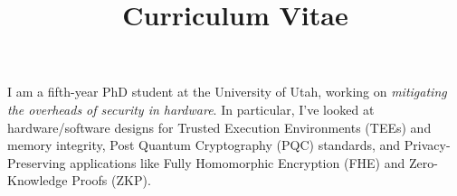 \documentclass[a4paper,skipsamekey,11pt,english]{curve}
\title{Curriculum Vitae}
\begin{document}
\makeheaders[c]

{I am a fifth-year PhD student at the University of Utah, working on \emph{mitigating the overheads of security in hardware}. In particular, I've looked at hardware/software designs for Trusted Execution Environments (TEEs) and memory integrity, Post Quantum Cryptography (PQC) standards, and Privacy-Preserving applications like Fully Homomorphic Encryption (FHE) and Zero-Knowledge Proofs (ZKP).}





% 
\end{document}
